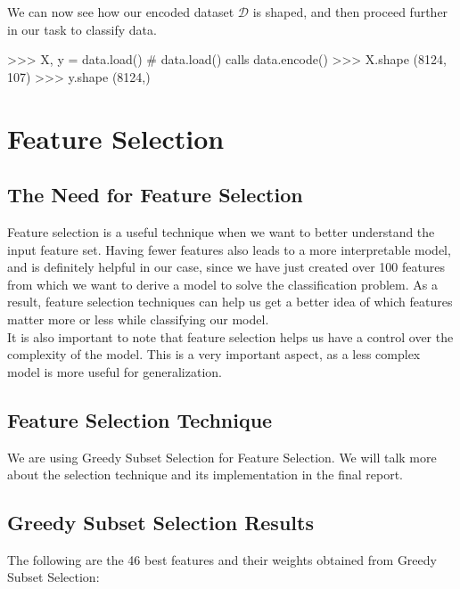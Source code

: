 \documentclass[fleqn]{article}
\begin{document}
    \noindent
    We can now see how our encoded dataset $ \mathcal{D} $ is shaped, and then proceed
    further in our task to classify data.

    \begin{python}
>>> X, y = data.load() # data.load() calls data.encode()
>>> X.shape
(8124, 107)
>>> y.shape
(8124,)
    \end{python}

    \section{Feature Selection}

    \subsection{The Need for Feature Selection}
    Feature selection is a useful technique when we want to better understand the input
    feature set. Having fewer features also leads to a more interpretable model, and is
    definitely helpful in our case, since we have just created over 100 features from
    which we want to derive a model to solve the classification problem. As a result,
    feature selection techniques can help us get a better idea of which features matter
    more or less while classifying our model.\\

    It is also important to note that feature selection helps us have a control over the
    complexity of the model. This is a very important aspect, as a less complex model
    is more useful for generalization.

    \subsection{Feature Selection Technique}
    We are using Greedy Subset Selection for Feature Selection. We will talk more about
    the selection technique and its implementation in the final report.

    \subsection{Greedy Subset Selection Results}
    The following are the 46 best features and their weights obtained from Greedy Subset
    Selection:
\end{document}
